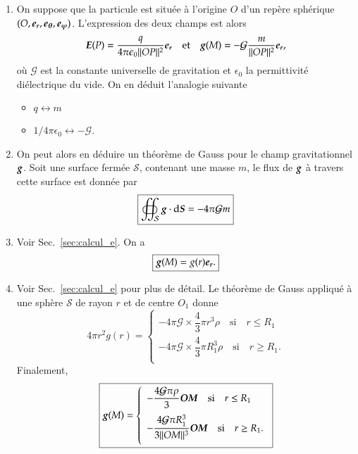 \begin{corrige}
	\begin{enumerate}
		\item On suppose que la particule est située à l'origine $O$ d'un repère
		sphérique $(O, \er, \etheta, \ephi)$. L'expression des deux champs est alors
		\begin{equation*}
			\vece(P) = \dfrac{q}{4 \pi \epsilon_0 ||OP||^2}\er
			\quad \mathrm{et} \quad \vecg(M) = 
			-\mathcal{G} \dfrac{m}{||OP||^2}\er,
		\end{equation*}
		où $\mathcal{G}$ est la constante universelle de gravitation
		et $\epsilon_0$ la permittivité diélectrique du vide.
		On en déduit l'analogie suivante
		\begin{itemize}
			\item $q \longleftrightarrow m$
			\item $1/4\pi \epsilon_0 \longleftrightarrow -\mathcal{G}$.
		\end{itemize}
	\item On peut alors en déduire un théorème de Gauss pour le champ
		gravitationnel $\vecg$. Soit une surface fermée $\mathcal{S}$,
		contenant une masse $m$, le flux de $\vecg$ à travers cette surface
		est donnée par
	      \begin{equation*}
		      \boxed{\oiint_\mathcal{S} \vecg \cdot \ds = - 4\pi \mathcal{G}m}
	      \end{equation*}
	\item Voir Sec.~\ref{sec:calcul_e}. On a 
	\begin{equation*}
		\boxed{\vecg(M) = g(r) \er.}
	\end{equation*}

\item Voir Sec.~\ref{sec:calcul_e} pour plus de détail. Le théorème de Gauss appliqué
	à une sphère $\mathcal{S}$ de rayon $r$ et de centre $O_1$ donne
	\begin{equation*}
		4 \pi r^2 g(r) =
		\left\{
		\begin{array}{l}
			- 4 \pi \mathcal{G}\times \dfrac{4}{3} \pi r^3 \rho 
			\quad \mathrm{si} \quad r \leq R_1 \\[1em]
			- 4 \pi \mathcal{G} \times \dfrac{4}{3} \pi R_1^3 \rho
			\quad \mathrm{si} \quad r \geq R_1. \\[1em]
		\end{array}
		\right.
	\end{equation*}
	Finalement,
	\begin{equation*}
		\boxed{
		\vecg(M) =
		\left\{
		\begin{array}{l}
			- \dfrac{4\mathcal{G} \pi\rho}{3}  \mitbf{OM}
			\quad \mathrm{si} \quad r \leq R_1 \\[1em]
			- \dfrac{4\mathcal{G} \pi R_1^3}{3||OM||^3}  \mitbf{OM} 
			\quad \mathrm{si} \quad r \geq R_1. \\[1em]
		\end{array}
		\right.
		}
	\end{equation*}


\end{enumerate}
\end{corrige}
